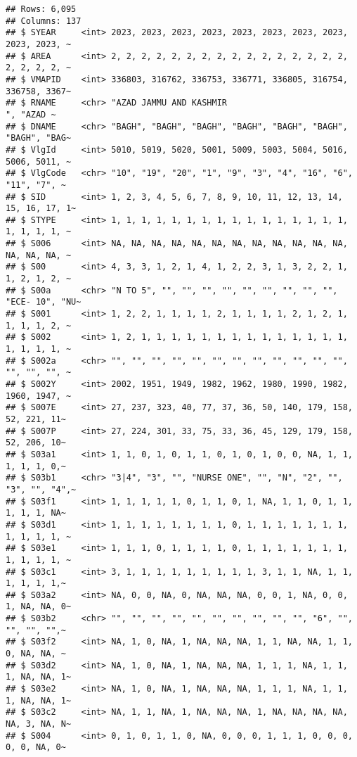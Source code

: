 \documentclass[
]{article}
\begin{document}
\begin{verbatim}
## Rows: 6,095
## Columns: 137
## $ SYEAR     <int> 2023, 2023, 2023, 2023, 2023, 2023, 2023, 2023, 2023, 2023, ~
## $ AREA      <int> 2, 2, 2, 2, 2, 2, 2, 2, 2, 2, 2, 2, 2, 2, 2, 2, 2, 2, 2, 2, ~
## $ VMAPID    <int> 336803, 316762, 336753, 336771, 336805, 316754, 336758, 3367~
## $ RNAME     <chr> "AZAD JAMMU AND KASHMIR                            ", "AZAD ~
## $ DNAME     <chr> "BAGH", "BAGH", "BAGH", "BAGH", "BAGH", "BAGH", "BAGH", "BAG~
## $ VlgId     <int> 5010, 5019, 5020, 5001, 5009, 5003, 5004, 5016, 5006, 5011, ~
## $ VlgCode   <chr> "10", "19", "20", "1", "9", "3", "4", "16", "6", "11", "7", ~
## $ SID       <int> 1, 2, 3, 4, 5, 6, 7, 8, 9, 10, 11, 12, 13, 14, 15, 16, 17, 1~
## $ STYPE     <int> 1, 1, 1, 1, 1, 1, 1, 1, 1, 1, 1, 1, 1, 1, 1, 1, 1, 1, 1, 1, ~
## $ S006      <int> NA, NA, NA, NA, NA, NA, NA, NA, NA, NA, NA, NA, NA, NA, NA, ~
## $ S00       <int> 4, 3, 3, 1, 2, 1, 4, 1, 2, 2, 3, 1, 3, 2, 2, 1, 1, 2, 1, 2, ~
## $ S00a      <chr> "N TO 5", "", "", "", "", "", "", "", "", "", "ECE- 10", "NU~
## $ S001      <int> 1, 2, 2, 1, 1, 1, 1, 2, 1, 1, 1, 1, 2, 1, 2, 1, 1, 1, 1, 2, ~
## $ S002      <int> 1, 2, 1, 1, 1, 1, 1, 1, 1, 1, 1, 1, 1, 1, 1, 1, 1, 1, 1, 1, ~
## $ S002a     <chr> "", "", "", "", "", "", "", "", "", "", "", "", "", "", "", ~
## $ S002Y     <int> 2002, 1951, 1949, 1982, 1962, 1980, 1990, 1982, 1960, 1947, ~
## $ S007E     <int> 27, 237, 323, 40, 77, 37, 36, 50, 140, 179, 158, 52, 221, 11~
## $ S007P     <int> 27, 224, 301, 33, 75, 33, 36, 45, 129, 179, 158, 52, 206, 10~
## $ S03a1     <int> 1, 1, 0, 1, 0, 1, 1, 0, 1, 0, 1, 0, 0, NA, 1, 1, 1, 1, 1, 0,~
## $ S03b1     <chr> "3|4", "3", "", "NURSE ONE", "", "N", "2", "", "3", "", "4",~
## $ S03f1     <int> 1, 1, 1, 1, 1, 0, 1, 1, 0, 1, NA, 1, 1, 0, 1, 1, 1, 1, 1, NA~
## $ S03d1     <int> 1, 1, 1, 1, 1, 1, 1, 1, 0, 1, 1, 1, 1, 1, 1, 1, 1, 1, 1, 1, ~
## $ S03e1     <int> 1, 1, 1, 0, 1, 1, 1, 1, 0, 1, 1, 1, 1, 1, 1, 1, 1, 1, 1, 1, ~
## $ S03c1     <int> 3, 1, 1, 1, 1, 1, 1, 1, 1, 1, 3, 1, 1, NA, 1, 1, 1, 1, 1, 1,~
## $ S03a2     <int> NA, 0, 0, NA, 0, NA, NA, NA, 0, 0, 1, NA, 0, 0, 1, NA, NA, 0~
## $ S03b2     <chr> "", "", "", "", "", "", "", "", "", "", "6", "", "", "", "",~
## $ S03f2     <int> NA, 1, 0, NA, 1, NA, NA, NA, 1, 1, NA, NA, 1, 1, 0, NA, NA, ~
## $ S03d2     <int> NA, 1, 0, NA, 1, NA, NA, NA, 1, 1, 1, NA, 1, 1, 1, NA, NA, 1~
## $ S03e2     <int> NA, 1, 0, NA, 1, NA, NA, NA, 1, 1, 1, NA, 1, 1, 1, NA, NA, 1~
## $ S03c2     <int> NA, 1, 1, NA, 1, NA, NA, NA, 1, NA, NA, NA, NA, NA, 3, NA, N~
## $ S004      <int> 0, 1, 0, 1, 1, 0, NA, 0, 0, 0, 1, 1, 1, 0, 0, 0, 0, 0, NA, 0~

\end{verbatim}
\end{document}
